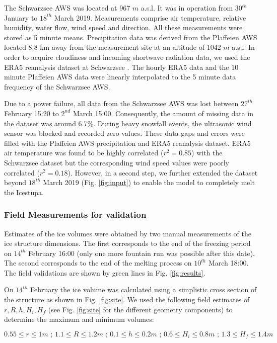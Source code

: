 \documentclass[utf8]{frontiersSCNS} %
\begin{document}
The Schwarzsee AWS was located at 967 $m$ a.s.l. It was in operation from $30^{th}$  January to $18^{th}$ March 2019.
Measurements comprise air temperature, relative humidity, water flow, wind speed and direction. All these measurements
were stored as 5 minute means. Precipitation data was derived from the Plaffeien AWS \citep{meteoswiss} located 8.8 km
away from the measurement site at an altitude of 1042 $m$ a.s.l. In order to acquire cloudiness and incoming shortwave
radiation data, we used the ERA5 reanalysis dataset at Schwarzsee \citep{era5}. The hourly ERA5 data and the 10 minute
Plaffeien AWS data were linearly interpolated to the 5 minute data frequency of the Schwarzsee AWS. 

Due to a power failure, all data from the Schwarzsee AWS was lost between $27^{th}$ February 15:20 to $2^{nd}$ March
15:00. Consequently, the amount of missing data in the dataset was around 6.7\%.  During heavy snowfall events, the
ultrasonic wind sensor was blocked and recorded zero values. These data gaps and errors were filled with the  Plaffeien
AWS precipitation and ERA5 reanalysis dataset. ERA5 air temperature was found to be highly correlated ($r^2 = 0.85$)
with the Schwarzsee dataset but the corresponding wind speed values were poorly correlated ($r^2 = 0.18$). However, in a
second step, we further extended the dataset beyond $18^{th}$ March 2019 (Fig.  \ref{fig:input}) to enable the model to
completely melt the Icestupa.

\subsubsection{Field Measurements for validation} \label{section:validation} Estimates of the ice volumes were obtained
by two manual measurements of the ice structure dimensions. The first corresponds to the end of the freezing period on
$14^{th}$ February 16:00 (only one more fountain run was possible after this date). The second corresponds to the end of
the melting process on $10^{th}$ March 18:00. The field validations are shown by green lines in Fig.
\ref{fig:results}.

On $14^{th}$ February the ice volume was calculated using a simplistic cross section of the structure as shown in Fig.
\ref{fig:site}. We used the following field estimates of $r, R, h, H_i, H_f$ (see Fig. \ref{fig:site} for the
different geometry components) to determine the maximum and minimum volumes:

\begin{equation} 0.55\leq r\leq 1 m\textit{ ; }1.1\leq R\leq 1.2 m\textit{ ; }0.1\leq h\leq 0.2 m\textit{ ; }0.6\leq
H_i\leq 0.8 m\textit{ ; }1.3\leq H_f\leq 1.4 m \end{equation}
\end{document}
